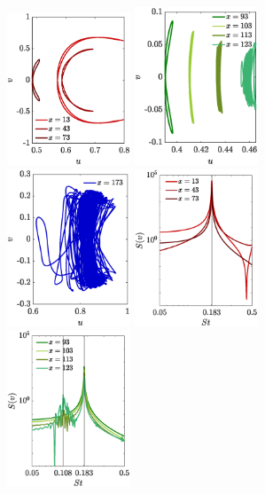 \begin{figure}
\centering
\includegraphics[width=0.328\textwidth]{./fig/appendix/uv_xw_AR3_Re450_a.eps}
\includegraphics[width=0.328\textwidth]{./fig/appendix/uv_xw_AR3_Re450_b.eps}
\includegraphics[width=0.328\textwidth]{./fig/appendix/uv_xw_AR3_Re450_c.eps}
\includegraphics[width=0.328\textwidth]{./fig/appendix/Spec_AR3_Re450_a.eps}
\includegraphics[width=0.328\textwidth]{./fig/appendix/Spec_AR3_Re450_b.eps}

\end{figure}
